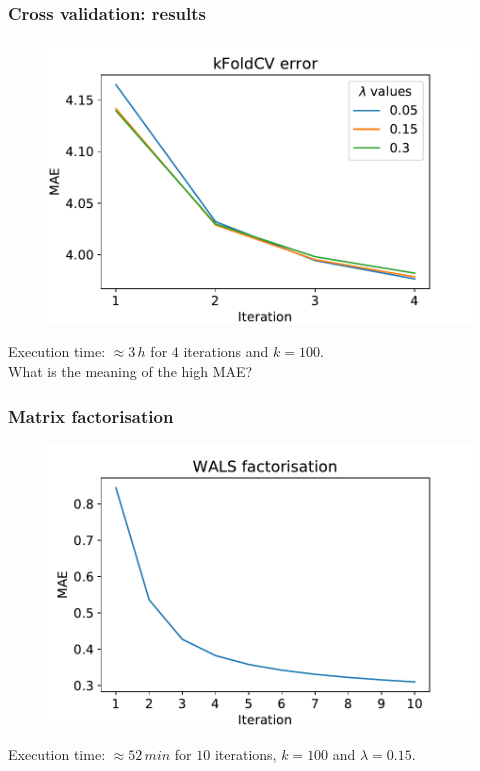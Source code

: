 \documentclass[xcolor = {table}]{beamer}
\begin{document}
  \begin{frame}
    \frametitle{Cross validation: results}

    \begin{figure}
      \centering
      \includegraphics[width=0.9\linewidth]{img/TestErrorCV.pdf}
    \end{figure}

    Execution time: $\approx 3\, h$ for $4$ iterations and $k = 100$.\\What is the meaning of the high MAE?

  \end{frame}



  \begin{frame}
    \frametitle{Matrix factorisation}

    \begin{figure}
      \centering
      \includegraphics[width=.9\linewidth]{img/WALS_train.pdf}
    \end{figure}

    Execution time: $\approx 52\, min$ for $10$ iterations, $k = 100$ and $\lambda = 0.15$.

  \end{frame}
\end{document}
